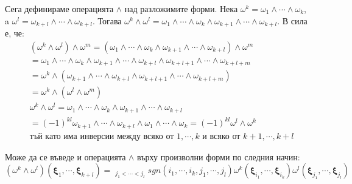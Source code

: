 \documentclass[12pt]{article}
\newcommand\myxi[0]{\boldsymbol{\xi}}
\begin{document}
\begin{large}
Сега дефинираме операцията $\wedge$ над разложимите форми. Нека $\omega^k=\omega_1 \wedge \cdots \wedge \omega_k$, a $\omega^l=\omega_{k+l} \wedge \cdots \wedge \omega_{k+l}$. Тогава $\omega^k \wedge \omega^l = \omega_1 \wedge \cdots \wedge \omega_k \wedge \omega_{k+1} \wedge \cdots \wedge \omega_{k+l}$. В сила е, че:
\begin{align*}
&(\omega^k \wedge \omega^l) \wedge \omega^m = (\omega_1 \wedge \cdots \wedge \omega_k \wedge \omega_{k+1} \wedge \cdots \wedge \omega_{k+l}) \wedge \omega^m \\ 
&=\omega_1 \wedge \cdots \wedge \omega_k \wedge \omega_{k+1} \wedge \cdots \wedge \omega_{k+l} \wedge \omega_{k+l+1} \wedge \cdots \wedge \omega_{k+l+m} \\
&= \omega^k \wedge (\omega_{k+1} \wedge \cdots \wedge \omega_{k+l} \wedge \omega_{k+l+1} \wedge \cdots \wedge \omega_{k+l+m}) \\
&=\omega^k \wedge (\omega^l \wedge \omega^m) \\[20pt]
&\omega^k \wedge \omega^l=\omega_1 \wedge \cdots \wedge \omega_k \wedge \omega_{k+1} \wedge \cdots \wedge \omega_{k+l} \\
&=(-1)^{kl}\omega_{k+1} \wedge \cdots \wedge \omega_{k+l} \wedge \omega_1 \wedge \cdots \wedge \omega_k = (-1)^{kl} \omega^l \wedge \omega^k \\
&\text{тъй като има инверсии между всяко от $1,\cdots,k$ и всяко от $k+1,\cdots,k+l$}
\end{align*}

Може да се въведе и операцията $\wedge$ върху произволни форми по следния начин: 
\[
(\omega^k \wedge \omega^l)(\myxi_1,\cdots,\myxi_{k+l})=\mathop{\sum_{i_1<\cdots<i_k}}_{j_1<\cdots<j_l}sgn(i_1,\cdots,i_k,j_1, \cdots,j_l) \omega^k(\myxi_{i_1},\cdots,\myxi_{i_k})\omega^l(\myxi_{j_1},\cdots,\myxi_{j_l})
\]


\end{large}
\end{document}
